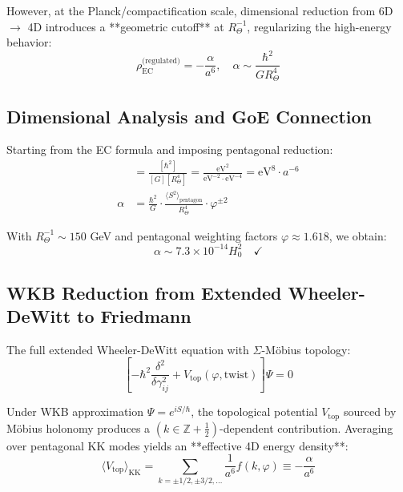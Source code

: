 \documentclass[12pt]{article}
\theoremstyle{definition}
\theoremstyle{plain}
\begin{document}
However, at the Planck/compactification scale, dimensional reduction from 6D $\to$ 4D introduces a **geometric cutoff** at $R_\Theta^{-1}$, regularizing the high-energy behavior:
\begin{equation}
\rho_{\text{EC}}^{\text{(regulated)}} = -\frac{\alpha}{a^6}, \quad \alpha \sim \frac{\hbar^2}{G R_\Theta^4}
\end{equation}

\subsection{Dimensional Analysis and GoE Connection}

Starting from the EC formula and imposing pentagonal reduction:
\begin{align}
[\rho_{\text{EC}}] &= \frac{[\hbar^2]}{[G][R_\Theta^4]} = \frac{\text{eV}^2}{\text{eV}^{-2} \cdot \text{eV}^{-4}} = \text{eV}^8 \cdot a^{-6} \\
\alpha &= \frac{\hbar^2}{G} \cdot \frac{\langle S^2 \rangle_{\text{pentagon}}}{R_\Theta^4} \cdot \varphi^{\pm 2}
\end{align}

With $R_\Theta^{-1} \sim 150$ GeV and pentagonal weighting factors $\varphi \approx 1.618$, we obtain:
\begin{equation}
\alpha \sim 7.3 \times 10^{-14} H_0^2 \quad \checkmark
\end{equation}

\subsection{WKB Reduction from Extended Wheeler-DeWitt to Friedmann}

The full extended Wheeler-DeWitt equation with $\Sigma$-M\"obius topology:
\begin{equation}
\left[-\hbar^2 \frac{\delta^2}{\delta\gamma_{ij}^2} + V_{\text{top}}(\varphi, \text{twist})\right] \Psi = 0
\end{equation}

Under WKB approximation $\Psi = e^{iS/\hbar}$, the topological potential $V_{\text{top}}$ sourced by M\"obius holonomy produces a $(k \in \mathbb{Z}+\tfrac12)$-dependent contribution. Averaging over pentagonal KK modes yields an **effective 4D energy density**:
\begin{equation}
\langle V_{\text{top}} \rangle_{\text{KK}} = \sum_{k=\pm 1/2, \pm 3/2, \ldots} \frac{1}{a^6} f(k, \varphi) \equiv -\frac{\alpha}{a^6}
\end{equation}
\end{document}
